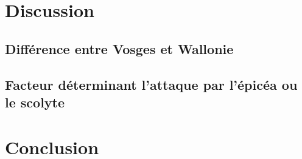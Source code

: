 \documentclass[3p,procedia]{elsarticle}
\begin{document}





\section{Discussion}

\subsection{Différence entre Vosges et Wallonie}
	
	
	

\subsection{Facteur déterminant l'attaque par l'épicéa ou le scolyte}

	

\section{Conclusion}
\end{document}
